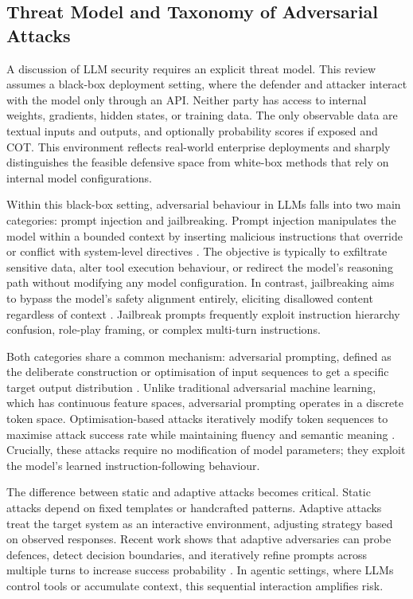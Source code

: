 \documentclass[conference]{IEEEtran}
\begin{document}
\subsection{Threat Model and Taxonomy of Adversarial Attacks}

A  discussion of LLM security requires an explicit threat model. This review assumes a black-box deployment setting, where the defender and attacker interact with the model only through an API. Neither party has access to internal weights, gradients, hidden states, or training data. The only observable data are textual inputs and outputs, and optionally probability scores if exposed and COT. This environment reflects real-world enterprise deployments and sharply distinguishes the feasible defensive space from white-box methods that rely on internal model configurations.

Within this black-box setting, adversarial behaviour in LLMs falls into two main categories: prompt injection and jailbreaking. Prompt injection manipulates the model within a bounded  context by inserting malicious instructions that override or conflict with system-level directives \cite{b2,b4}. The objective is typically to exfiltrate sensitive data, alter tool execution behaviour, or redirect the model's reasoning path without modifying any model configuration. In contrast, jailbreaking aims to bypass the model's safety alignment entirely, eliciting disallowed content regardless of context \cite{b2}. Jailbreak prompts frequently exploit instruction hierarchy confusion, role-play framing, or complex multi-turn instructions.

Both categories share a common mechanism: adversarial prompting, defined as the deliberate construction or optimisation of input sequences to get a specific target output distribution \cite{b10}. Unlike traditional adversarial machine learning, which has continuous feature spaces, adversarial prompting operates in a discrete token space. Optimisation-based attacks iteratively modify token sequences to maximise attack success rate while maintaining fluency and semantic meaning \cite{b10}. Crucially, these attacks require no modification of model parameters; they exploit the model's learned instruction-following behaviour.

The difference between static and adaptive attacks becomes critical. Static attacks depend on fixed templates or handcrafted patterns. Adaptive attacks treat the target system as an interactive environment, adjusting strategy based on observed responses. Recent work shows that adaptive adversaries can probe defences, detect decision boundaries, and iteratively refine prompts across multiple turns to increase success probability \cite{b16}. In agentic settings, where LLMs control tools or accumulate context, this sequential interaction amplifies risk.
\end{document}
